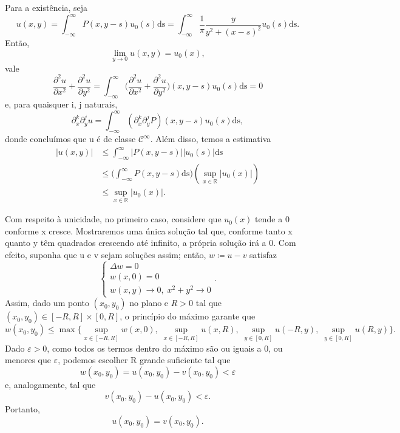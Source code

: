 \documentclass[../pde_notes.tex]{subfiles}
\begin{document}
\begin{proof*}
	Para a existência, seja
	\[
		u(x, y) = \int_{-\infty}^{\infty}P(x, y-s)u_{0}(s) \mathrm{ds} = \int_{-\infty}^{\infty}\frac{1}{\pi }\frac{y}{y^{2}+(x-s)^{2}}u_{0}(s) \mathrm{ds}.
	\]
	Então,
	\[
		\lim_{y\to 0}u(x, y) = u_{0}(x),
	\]
	vale
	\[
		\frac{\partial^{2}u}{\partial x^{2}}+\frac{\partial^{2}u}{\partial y^{2}} = \int_{-\infty}^{\infty}\biggl(\frac{\partial^{2}u}{\partial x^{2}}+\frac{\partial^{2}u}{\partial y^{2}}\biggr)(x, y-s)u_{0}(s) \mathrm{ds}=0
	\]
	e, para quaisquer i, j naturais,
	\[
		\partial_{x}^{k}\partial_{y}^{j}u = \int_{-\infty}^{\infty}(\partial_{x}^{k}\partial_{y}^{j}P)(x, y-s) u_{0}(s) \mathrm{ds},
	\]
	donde concluímos que u é de classe \(\mathcal{C}^{\infty}\). Além disso, temos a estimativa
	\begin{align*}
		|u(x, y)| & \leq \int_{-\infty}^{\infty}|P(x, y-s)||u_{0}(s)| \mathrm{ds}                                     \\
		          & \leq \biggl(\int_{-\infty}^{\infty}P(x, y-s) \mathrm{ds}\biggr)(\sup_{x\in \mathbb{R}}|u_{0}(x)|) \\
		          & \leq \sup_{x\in \mathbb{R}}|u_{0}(x)|.
	\end{align*}

	Com respeito à unicidade, no primeiro caso, considere que \(u_{0}(x)\) tende a 0 conforme x cresce. Mostraremos uma única solução tal que, conforme tanto x quanto y têm quadrados crescendo até infinito, a própria solução irá a 0. Com efeito, suponha que u e v sejam soluções assim; então, \(w\coloneqq u-v\) satisfaz
	\[
		\left\{\begin{array}{ll}
			\Delta w = 0 \\
			w(x, 0) = 0  \\
			w(x, y) \longrightarrow 0,\; x^{2}+y^{2}\rightarrow 0
		\end{array}\right..
	\]
	Assim, dado um ponto \((x_{0}, y_{0})\) no plano e \(R > 0\) tal que \((x_{0}, y_{0})\in [-R, R]\times [0, R]\), o princípio do máximo garante que
	\[
		w(x_{0}, y_{0}) \leq \max\limits_{}\{\sup_{x\in [-R, R]}w(x, 0),\; \sup_{x\in[-R, R]}u(x, R),\; \sup_{y\in[0, R]}u(-R, y),\; \sup_{y\in [0, R]}u(R, y)\}.
	\]
	Dado \(\varepsilon > 0\), como todos os termos dentro do máximo são ou iguais a 0, ou menores que \(\varepsilon \), podemos escolher R grande suficiente tal que
	\[
		w(x_{0}, y_{0}) = u(x_{0}, y_{0}) - v(x_{0}, y_{0}) < \varepsilon
	\]
	e, analogamente, tal que
	\[
		v(x_{0}, y_{0}) - u(x_{0}, y_{0}) < \varepsilon.
	\]
	Portanto,
	\[
		u(x_{0}, y_{0}) = v(x_{0}, y_{0}).
	\]


\end{proof*}
\end{document}
